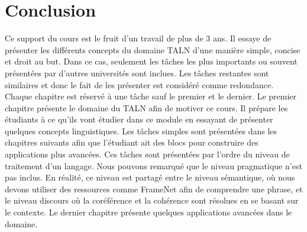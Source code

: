 \documentclass{KodeBook}
\begin{document}
		\mainmatter
	
\fi

\chapter*{Conclusion}



Ce support du cours est le fruit d'un travail de plus de 3 ans. 
Il essaye de présenter les différents concepts du domaine TALN d'une manière simple, concise et droit au but.
Dans ce cas, seulement les tâches les plus importants ou souvent présentées par d'autres universités sont inclues.
Les tâches restantes sont similaires et donc le fait de les présenter est considéré comme redondance.
Chaque chapitre est réservé à une tâche sauf le premier et le dernier.
Le premier chapitre présente le domaine du TALN afin de motiver ce cours. 
Il prépare les étudiants à ce qu'ils vont étudier dans ce module en essayant de présenter quelques concepts linguistiques.
Les tâches simples sont présentées dans les chapitres suivants afin que l'étudiant ait des blocs pour construire des applications plus avancées.
Ces tâches sont présentées par l'ordre du niveau de traitement d'un langage.
Nous pouvons remarqué que le niveau pragmatique n'est pas inclus.
En réalité, ce niveau est partagé entre le niveau sémantique, où nous devons utiliser des ressources comme FrameNet afin de comprendre une phrase, et le niveau discours où la coréférence et la cohérence sont résolues en se basant sur le contexte.
Le dernier chapitre présente quelques applications avancées dans le domaine.
\end{document}
